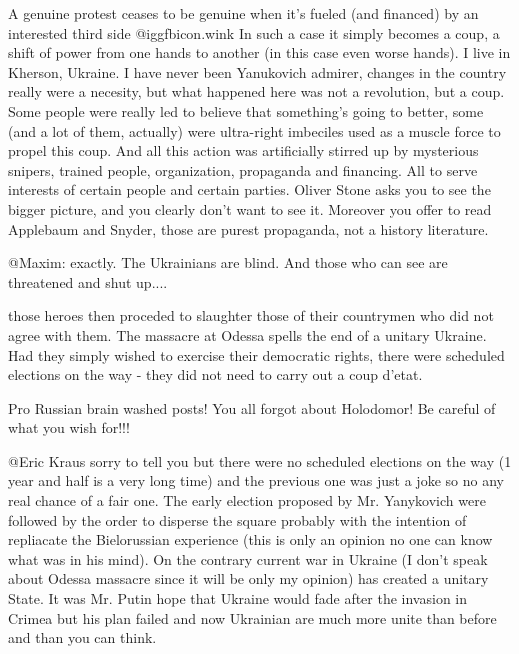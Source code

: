 \begin{itemize}
\begin{itemize}
A genuine protest ceases to be genuine when it's fueled (and financed) by an
interested third side  @igg{fbicon.wink}  In such a case it simply becomes a coup, a shift of
power from one hands to another (in this case even worse hands). I live in
Kherson, Ukraine. I have never been Yanukovich admirer, changes in the country
really were a necesity, but what happened here was not a revolution, but a
coup. Some people were really led to believe that something's going to better,
some (and a lot of them, actually) were ultra-right imbeciles used as a muscle
force to propel this coup. And all this action was artificially stirred up by
mysterious snipers, trained people, organization, propaganda and financing. All
to serve interests of certain people and certain parties. Oliver Stone asks you
to see the bigger picture, and you clearly don't want to see it. Moreover you
offer to read Applebaum and Snyder, those are purest propaganda, not a history
literature.


@Maxim: exactly. The Ukrainians are blind. And those who can see are threatened
and shut up....


those heroes then proceded to slaughter those of their countrymen who did not
agree with them. The massacre at Odessa spells the end of a unitary Ukraine.
Had they simply wished to exercise their democratic rights, there were
scheduled elections on the way - they did not need to carry out a coup d'etat.


Pro Russian brain washed posts! You all forgot about Holodomor! Be careful of what you wish for!!!


@Eric Kraus sorry to tell you but there were no scheduled elections on the way
(1 year and half is a very long time) and the previous one was just a joke so
no any real chance of a fair one. The early election proposed by Mr. Yanykovich
were followed by the order to disperse the square probably with the intention
of repliacate the Bielorussian experience (this is only an opinion no one can
know what was in his mind). On the contrary current war in Ukraine (I don't
speak about Odessa massacre since it will be only my opinion) has created a
unitary State. It was Mr. Putin hope that Ukraine would fade after the invasion
in Crimea but his plan failed and now Ukrainian are much more unite than before
and than you can think.



\end{itemize}
\end{itemize}
